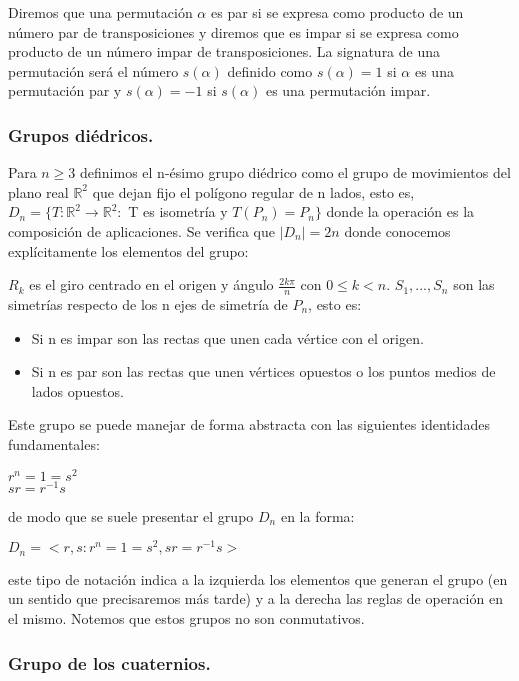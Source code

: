 \begin{definition}
Diremos que una permutación $\alpha$ es par si se expresa como producto de un número par de transposiciones y diremos que es impar si se expresa como producto de un número impar de transposiciones. La signatura de una permutación será el número $s(\alpha)$ definido como $s(\alpha) = 1$ si $\alpha$ es una permutación par y $s(\alpha) = -1$ si $s(\alpha)$ es una permutación impar.
\end{definition}

\subsubsection{Grupos diédricos.}

Para $n \ge 3$ definimos el n-ésimo grupo diédrico como el grupo de movimientos del plano real $\mathbb{R}^2$ que dejan fijo el polígono regular de n lados, esto es, $D_n = \{T:\mathbb{R}^2 \rightarrow \mathbb{R}^2 :$ T es isometría  y  $T(P_n) = P_n\}$ donde la operación es la composición de aplicaciones. Se verifica que $|D_n| = 2n$ donde conocemos explícitamente los elementos del grupo:

$R_k$ es el giro centrado en el origen y ángulo $\frac{2k\pi}{n}$ con $0 \le k < n$.
$S_1,...,S_n$ son las simetrías respecto de los n ejes de simetría de $P_n$, esto es:
\begin{itemize}
\item Si n es impar son las rectas que unen cada vértice con el origen.
\item Si n es par son las rectas que unen vértices opuestos o los puntos medios de lados opuestos.
\end{itemize}
  
Este grupo se puede manejar de forma abstracta con las siguientes identidades fundamentales:

$r^n = 1 = s^2$\\
$sr = r^{-1}s$

de modo que se suele presentar el grupo $D_n$ en la forma:

$D_n = <r,s : r^n = 1 = s^2,sr = r^{-1}s>$

este tipo de notación indica a la izquierda los elementos que generan el grupo (en un sentido que precisaremos más tarde) y a la derecha las reglas de operación en el mismo. Notemos que estos grupos no son conmutativos.

\subsubsection{Grupo de los cuaternios.}

